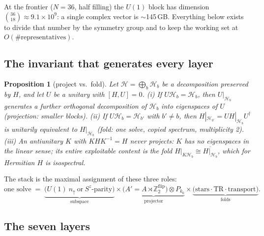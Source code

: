 \documentclass[11pt]{article}
\newtheorem{prop}{Proposition}[section]
\newcommand{\Z}{\mathbb{Z}}
\newcommand{\Hs}{\mathcal{H}}
\begin{document}
At the frontier ($N = 36$, half filling) the $U(1)$ block has dimension
$\binom{36}{18} \approx 9.1\times 10^9$: a single complex vector is
$\sim$145\,GB. Everything below exists to divide that number by the
symmetry group and to keep the working set at $O(\#\text{representatives})$.

\subsection{The invariant that generates every layer}
\label{sec:invariant}

\begin{prop}[project vs.\ fold]\label{prop:projfold}
Let $\Hs = \bigoplus_b \Hs_b$ be a decomposition preserved by $H$, and let
$U$ be a unitary with $[H,U]=0$.
(i) If $U\Hs_b = \Hs_b$, then $U|_{\Hs_b}$ generates a further orthogonal
decomposition of $\Hs_b$ into eigenspaces of $U$ (\emph{projection}: smaller
blocks).
(ii) If $U\Hs_b = \Hs_{b'}$ with $b' \ne b$, then
$H|_{\Hs_{b'}} = U H|_{\Hs_b} U^\dagger$ is unitarily equivalent to
$H|_{\Hs_b}$ (\emph{fold}: one solve, copied spectrum, multiplicity 2).
(iii) An antiunitary $K$ with $KHK^{-1}=H$ never projects: $K$ has no
eigenspaces in the linear sense; its entire exploitable content is the fold
$H|_{K\Hs_b} \cong \overline{H|_{\Hs_b}}$, which for Hermitian $H$ is
isospectral.
\end{prop}

The stack is the maximal assignment of these three roles:
\[
\text{one solve} \;=\;
\underbrace{\bigl(U(1)\ n_\uparrow \ \text{or}\ S^z\text{-parity}\bigr)}_{\text{subspace}}
\times
\underbrace{\bigl(A' = A \rtimes \Z_2^{\text{flip}}\bigr) \otimes P_{k_0}}_{\text{projector}}
\times
\underbrace{\bigl(\text{stars} \cdot \text{TR} \cdot \text{transport}\bigr)}_{\text{folds}}.
\]

\subsection{The seven layers}
\end{document}
